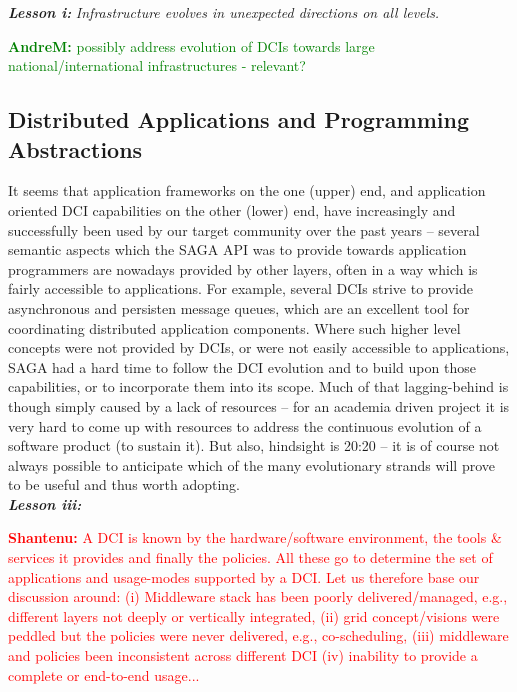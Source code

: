 \documentclass[]{article}
\newcommand{\I}[1]{\textit{#1}}
\newcommand{\B}[1]{\textbf{#1}}
\newcommand{\BI}[1]{\textbf{\textit{#1}}}
\newcommand{\jhanote}[1]{{\textcolor{red}{     \B{Shantenu:} #1 }}}
\newcommand{\amnote}[1]{{\textcolor{green}{   \B{AndreM:  } #1 }}}
\newcommand{\jhanote}[1]{}
\newcommand{\amnote}[1]{}
\begin{document}
  \BI{Lesson i:} \I{Infrastructure evolves in unexpected directions  on all
  levels.}

  \amnote{possibly address evolution of DCIs towards large
  national/international infrastructures - relevant?}


 \subsection{Distributed Applications and Programming Abstractions}

  It seems that application frameworks on the one (upper) end, and
  application oriented DCI capabilities on the other (lower) end, have
  increasingly and successfully been used by our target community over
  the past years -- several semantic aspects which the SAGA API was to
  provide towards application programmers are nowadays provided by other
  layers, often in a way which is fairly accessible to applications.
  For example, several DCIs strive to provide asynchronous and persisten
  message queues, which are an excellent tool for coordinating
  distributed application components.  Where such higher level concepts
  were not provided by DCIs, or were not easily accessible to
  applications, SAGA had a hard time to follow the DCI evolution and to
  build upon those capabilities, or to incorporate them into its scope.
  Much of that lagging-behind is though simply caused by a lack of
  resources -- for an academia driven project it is very hard to come up
  with resources to address the continuous evolution of a software
  product (to sustain it).  But also, hindsight is 20:20 -- it is of
  course not always possible to anticipate which of the many
  evolutionary strands will prove to be useful and thus worth
  adopting.\\
  \BI{Lesson iii:} 


  \jhanote{A DCI is known by the hardware/software environment, the
  tools \& services it provides and finally the policies. All these go
  to determine the set of applications and usage-modes supported by
  a DCI. Let us therefore base our discussion around: (i) Middleware
  stack has been poorly delivered/managed, e.g., different layers not
  deeply or vertically integrated, (ii) grid concept/visions were
  peddled but the policies were never delivered, e.g., co-scheduling,
  (iii) middleware and policies been inconsistent across different DCI
  (iv) inability to provide a complete or end-to-end usage...}
  
\end{document}
